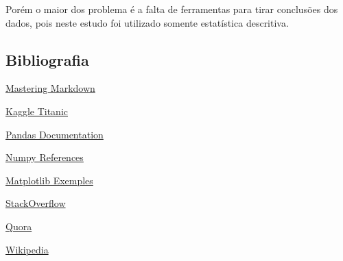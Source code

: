 \documentclass[11pt]{article}
\begin{document}
Porém o maior dos problema é a falta de ferramentas para tirar
conclusões dos dados, pois neste estudo foi utilizado somente
estatística descritiva.

    \hypertarget{bibliografia}{%
\subsection{Bibliografia}\label{bibliografia}}

\href{https://guides.github.com/features/mastering-markdown/}{Mastering
Markdown}

\href{https://www.kaggle.com/c/titanic/data}{Kaggle Titanic}

\href{http://pandas.pydata.org/pandas-docs/stable/}{Pandas
Documentation}

\href{https://docs.scipy.org/doc/numpy-1.16.1/reference/}{Numpy
References}

\href{https://matplotlib.org/gallery/index.html}{Matplotlib Exemples}

\href{https://stackoverflow.com/}{StackOverflow}

\href{https://www.quora.com/What-were-the-ticket-prices-to-board-the-Titanic}{Quora}

\href{https://en.wikipedia.org/wiki/RMS_Titanic}{Wikipedia}


    
    
    
    
\end{document}
